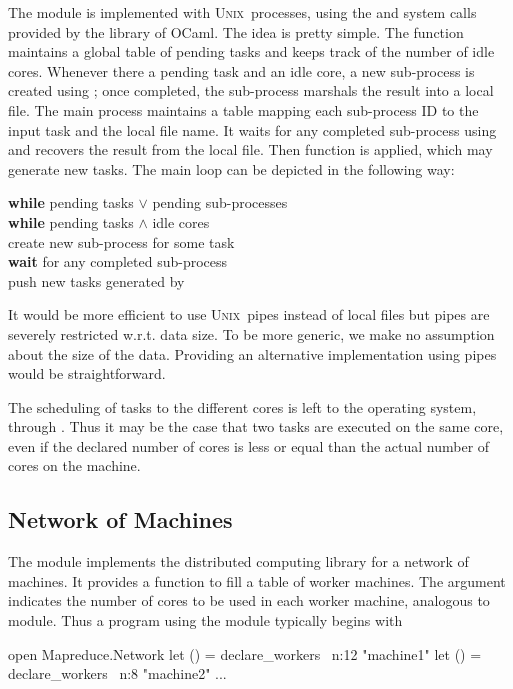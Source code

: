 \documentclass[preprint]{sigplanconf}
\newcommand{\Ocaml}{OCaml}
\newcommand{\unix}{\textsc{Unix}}
\begin{document}
The  module is implemented with \unix\ processes, using the
 and  system calls provided by the  library
of \Ocaml. The idea is pretty simple. 
The  function maintains a global table of pending tasks
and keeps track of the number of idle cores.
Whenever there a pending task and an idle core, 
a new sub-process is created using ; 
once completed, the sub-process marshals the result 
into a local file. The main process maintains a table
mapping each sub-process ID to the input task and the local file
name. It waits for any completed sub-process using 
and recovers the result from the local file. Then function 
is applied, which may generate new tasks.
The main loop can be depicted in the following way:
\begin{flushleft}
  \quad  \textbf{while} pending tasks $\lor$ pending sub-processes \\
  \quad  \quad \textbf{while} pending tasks $\land$ idle cores \\
  \quad  \quad \quad create new sub-process for some task \\
  \quad  \quad \textbf{wait} for any completed sub-process \\
  \quad  \quad \quad push new tasks generated by  \\
\end{flushleft}

It would be more efficient to use \unix\ pipes instead of local files
but pipes are severely restricted w.r.t. data size. To be more
generic, we make no assumption about the size of the data. Providing
an alternative implementation using pipes would be straightforward.

The scheduling of tasks to the different cores is left to the
operating system, through . Thus it may be the case that
two tasks are executed on the same core, even if the declared number
of cores is less or equal than the actual number of cores on the machine.

\subsection{Network of Machines}

The  module implements the distributed computing library for
a network of machines. 
It provides a function  
to fill a table of worker machines. The argument  indicates the
number of cores to be used in each worker machine, analogous to 
 module. Thus a program using the  module
typically begins with
\begin{ocaml}
open Mapreduce.Network
let () = declare_workers ~n:12 "machine1"
let () = declare_workers ~n:8  "machine2"
...
\end{ocaml}
\end{document}
